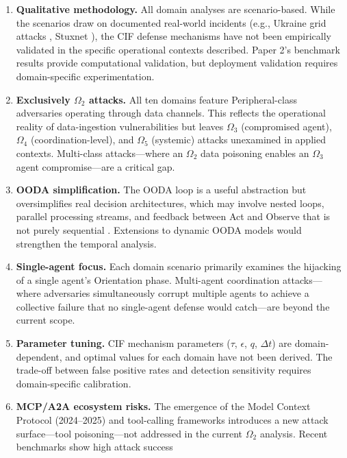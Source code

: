 \documentclass[
]{article}
\begin{document}
\begin{enumerate}
\def\labelenumi{\arabic{enumi}.}
\item
  \textbf{Qualitative methodology.} All domain analyses are
  scenario-based. While the scenarios draw on documented real-world
  incidents (e.g., Ukraine grid attacks \cite{liang2017review}, Stuxnet
  \cite{langner2011stuxnet}), the CIF defense mechanisms have not been
  empirically validated in the specific operational contexts described.
  Paper 2's benchmark results \cite{friedman2026cogsec2} provide
  computational validation, but deployment validation requires
  domain-specific experimentation.
\item
  \textbf{Exclusively \(\Omega_2\) attacks.} All ten domains feature
  Peripheral-class adversaries operating through data channels. This
  reflects the operational reality of data-ingestion vulnerabilities but
  leaves \(\Omega_3\) (compromised agent), \(\Omega_4\)
  (coordination-level), and \(\Omega_5\) (systemic) attacks unexamined
  in applied contexts. Multi-class attacks---where an \(\Omega_2\) data
  poisoning enables an \(\Omega_3\) agent compromise---are a critical
  gap.
\item
  \textbf{OODA simplification.} The OODA loop is a useful abstraction
  but oversimplifies real decision architectures, which may involve
  nested loops, parallel processing streams, and feedback between Act
  and Observe that is not purely sequential \cite{brehmer2005dynamic}.
  Extensions to dynamic OODA models would strengthen the temporal
  analysis.
\item
  \textbf{Single-agent focus.} Each domain scenario primarily examines
  the hijacking of a single agent's Orientation phase. Multi-agent
  coordination attacks---where adversaries simultaneously corrupt
  multiple agents to achieve a collective failure that no single-agent
  defense would catch---are beyond the current scope.
\item
  \textbf{Parameter tuning.} CIF mechanism parameters (\(\tau\),
  \(\epsilon\), \(q\), \(\Delta t\)) are domain-dependent, and optimal
  values for each domain have not been derived. The trade-off between
  false positive rates and detection sensitivity requires
  domain-specific calibration.
\item
  \textbf{MCP/A2A ecosystem risks.} The emergence of the Model Context
  Protocol (2024--2025) and tool-calling frameworks introduces a new
  attack surface---tool poisoning---not addressed in the current
  \(\Omega_2\) analysis. Recent benchmarks show high attack success

\end{enumerate}
\end{document}
